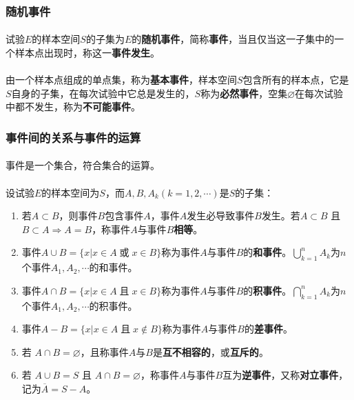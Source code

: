 \subsubsection{随机事件}
\paragraph{}
试验$E$的样本空间$S$的子集为$E$的\textbf{随机事件}，简称\textbf{事件}，当且仅当这一子集中的一个样本点出现时，称这一\textbf{事件发生}。

\paragraph{}
由一个样本点组成的单点集，称为\textbf{基本事件}，样本空间$S$包含所有的样本点，它是$S$自身的子集，在每次试验中它总是发生的，$S$称为\textbf{必然事件}，空集$\varnothing$在每次试验中都不发生，称为\textbf{不可能事件}。

\subsubsection{事件间的关系与事件的运算}
\paragraph{}
事件是一个集合，符合集合的运算。

\paragraph{}
设试验$E$的样本空间为$S$，而$A, B, A_k(k = 1, 2, \cdots)$是$S$的子集：

\begin{enumerate}
  \item 若$A \subset B$，则事件$B$包含事件$A$，事件$A$发生必导致事件$B$发生。若$A \subset B$ 且 $B \subset A \Rightarrow A = B$，称事件$A$与事件$B$\textbf{相等}。
  \item 事件$A \cup B = \{x | x \in A \; \text{或} \; x \in B\}$称为事件$A$与事件$B$的\textbf{和事件}。${\displaystyle \bigcup_{k=1}^{n}} A_k$为$n$个事件$A_1, A_2, \cdots$的和事件。
  \item 事件$A \cap B=\{x | x \in A \; \text{且} \; x \in B\}$称为事件$A$与事件$B$的\textbf{积事件}。${\displaystyle \bigcap_{k=1}^{n}} A_k$为$n$个事件$A_1, A_2, \cdots$的积事件。
  \item 事件$A-B=\{x | x \in A \; \text{且} \; x \notin B\}$称为事件$A$与事件$B$的\textbf{差事件}。
  \item 若 $A \cap B = \varnothing$，且称事件$A$与$B$是\textbf{互不相容的}，或\textbf{互斥的}。
  \item 若 $A \cup B = S$ 且 $A \cap B = \varnothing$，称事件$A$与事件$B$互为\textbf{逆事件}，又称\textbf{对立事件}，记为$\overline{A} = S - A$。
\end{enumerate}

